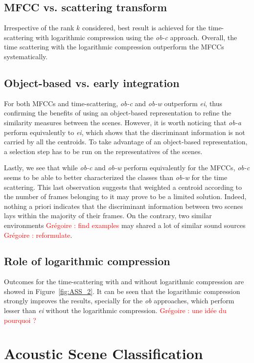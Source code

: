 \documentclass[journal]{IEEEtran}
\makeatletter
\newcommand*{\vs}{vs.\@\xspace}
\newcommand{\gl}[1]{\textcolor{red}{Gr\'egoire : #1}}
\makeatother
\begin{document}
\subsection{MFCC \vs scattering transform}

Irrespective of the rank $k$ considered, best result is achieved for the time-scattering with logarithmic compression using the \emph{ob-c} approach. Overall, the time scattering with the logarithmic compression outperform the MFCCs systematically.

\subsection{Object-based \vs early integration}

For both MFCCs and time-scattering, \emph{ob-c} and \emph{ob-w} outperform \emph{ei}, thus confirming the benefits of using an object-based representation to refine the similarity measures between the scenes. However, it is worth noticing that \emph{ob-a} perform equivalently to \emph{ei}, which shows that the discriminant information is not carried by all the centroids. To take advantage of an object-based representation, a selection step has to be run on the representatives of the scenes.

Lastly, we see that while \emph{ob-c} and \emph{ob-w} perform equivalently for the MFCCs, \emph{ob-c} seems to be able to better characterized the classes than \emph{ob-w} for the time scattering. This last observation suggests that weighted a centroid according to the number of frames belonging to it may prove to be a limited solution. Indeed, nothing a priori indicates that the discriminant information between two scenes lays within the majority of their frames. On the contrary, two similar environments  \gl{find examples} may shared a lot of similar sound sources \gl{reformulate}.

\subsection{Role of logarithmic compression}

Outcomes for the time-scattering with and without logarithmic compression are showed in Figure~\ref{fig:ASS_2}. It can be seen that the logarithmic compression strongly improves the results, specially for the \emph{ob} approaches, which perform lesser than \emph{ei} without the logarithmic compression. \gl{une idée du pourquoi ?}

\section{Acoustic Scene Classification}
\end{document}
